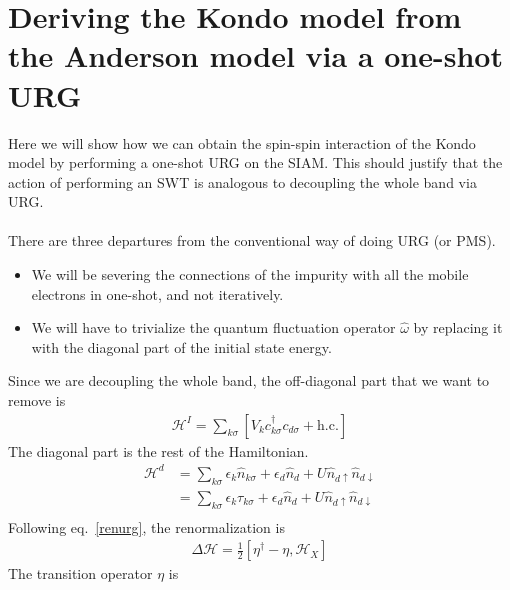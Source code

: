 \documentclass[twoside,11pt]{report}
\numberwithin{equation}{section}
\begin{document}
\section{Deriving the Kondo model from the Anderson model via a one-shot URG}\label{SWT from URG}
Here we will show how we can obtain the spin-spin interaction of the Kondo model by performing a one-shot URG on the SIAM. This should justify that the action of performing an SWT is analogous to decoupling the whole band via URG. \\\\There are three departures from the conventional way of doing URG (or PMS).
\begin{itemize}
    \item We will be severing the connections of the impurity with all the mobile electrons in one-shot, and not iteratively.
    \item We will have to trivialize the quantum fluctuation operator \(\hat \omega\) by replacing it with the diagonal part of the initial state energy.
\end{itemize}
Since we are decoupling the whole band, the off-diagonal part that we want to remove is
\begin{equation}\begin{aligned}
	\mathcal{H}^I = \sum_{k\sigma}\left[V_k c^\dagger_{k\sigma}c_{d\sigma}+\text{h.c.}\right]
\end{aligned}\end{equation}
The diagonal part is the rest of the Hamiltonian.
\begin{equation}\begin{aligned}
\mathcal{H}^d &= \sum_{k\sigma}\epsilon_k\hat n_{k\sigma} + \epsilon_d\hat n_d + U\hat n_{d\uparrow}\hat n_{d\downarrow}\\
&= \sum_{k\sigma}\epsilon_k\tau_{k\sigma} + \epsilon_d\hat n_d + U\hat n_{d\uparrow}\hat n_{d\downarrow}\\
\end{aligned}\end{equation}
Following eq.~\ref{renurg}, the renormalization is
\begin{equation}\begin{aligned}
	\Delta \mathcal{H} = \frac{1}{2}\left[\eta^\dagger - \eta, \mathcal{H}_X\right]
\end{aligned}\end{equation}
The transition operator \(\eta\) is
\end{document}

